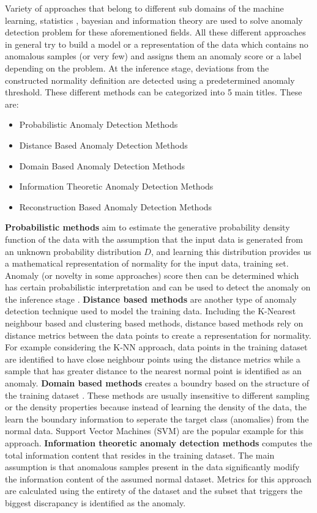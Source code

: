 Variety of approaches that belong to different sub domains of the machine learning, statistics ,
bayesian and information theory are used to solve anomaly detection problem for these aforementioned
fields. All these different approaches in general try to build a model or a representation of the
data which contains no anomalous samples (or very few) and assigns 
them an anomaly score or a label depending on the problem. At the inference stage, deviations from the constructed normality
definition are detected using a predetermined anomaly threshold. These different methods can be
categorized into 5 main titles. These are:

\begin{itemize}
  \item Probabilistic Anomaly Detection Methods
  \item Distance Based Anomaly Detection Methods
  \item Domain Based Anomaly Detection Methods
  \item Information Theoretic Anomaly Detection Methods
  \item Reconstruction Based Anomaly Detection Methods  
\end{itemize}

\textbf{Probabilistic methods} aim to estimate the generative probability density function of the data
with the assumption that the input data is generated from an unknown probability distribution $D$,
and learning this distribution provides us a mathematical representation of normality for the input
data, training set. Anomaly (or novelty in some approaches) score then can be determined which has
certain probabilistic interpretation and can be used to detect the anomaly on the inference stage
\cite{Pimentel:2014:RRN:2588908.2589196}. \textbf{Distance based methods} are another type of 
anomaly detection technique used to model the training data.
Including the K-Nearest neighbour based and clustering based methods, distance based methods rely on
distance metrics between the data points to create a representation for normality. For example
considering the K-NN approach, data points in the training dataset are identified to have close
neighbour points using the distance metrics while a sample that has greater distance to the
nearest normal point is identified as an anomaly. \textbf{Domain based methods} creates a 
boundry based on the structure of the training dataset \cite{Pimentel:2014:RRN:2588908.2589196}.
These methods are usually insensitive to
different sampling or the density properties because instead of learning the density of
the data, the learn the boundary information to seperate the target class (anomalies) from the
normal data. Support Vector Machines (SVM) are the popular example for this approach. \textbf{Information
theoretic anomaly detection methods} computes the total information content that resides in the
training dataset. The main assumption is that anomalous samples present in the data significantly
modify the information content of the assumed normal dataset. Metrics for this approach are
calculated using the entirety of the dataset and the subset that triggers the biggest discrapancy is
identified as the anomaly. 

